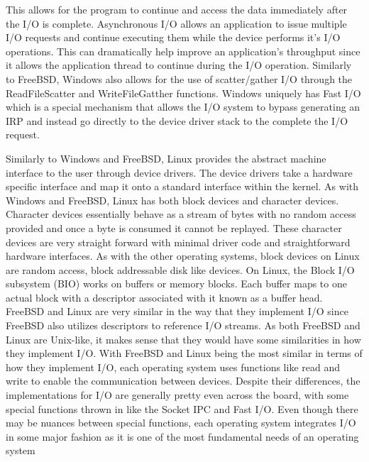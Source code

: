 \documentclass[letterpaper,10pt,draftclsnofoot,onecolumn,titlepage]{IEEEtran}
\begin{document}
	This allows for the program to continue and access the data immediately after the I/O is complete.
	Asynchronous I/O allows an application to issue multiple I/O requests and continue executing them while the device performs it's I/O operations.
	This can dramatically help improve an application's throughput since it allows the application thread to continue during the I/O operation.
	Similarly to FreeBSD, Windows also allows for the use of scatter/gather I/O through the ReadFileScatter and WriteFileGatther functions.
	Windows uniquely has Fast I/O which is a special mechanism that allows the I/O system to bypass generating an IRP and instead go directly to the device driver stack to the complete the I/O request.

	Similarly to Windows and FreeBSD, Linux provides the abstract machine interface to the user through device drivers.
	The device drivers take a hardware specific interface and map it onto a standard interface within the kernel.
	As with Windows and FreeBSD, Linux has both block devices and character devices.
	Character devices essentially behave as a stream of bytes with no random access provided and once a byte is consumed it cannot be replayed. \cite{Linux}
	These character devices are very straight forward with minimal driver code and straightforward hardware interfaces.
	As with the other operating systems, block devices on Linux are random access, block addressable disk like devices.
	On Linux, the Block I/O subsystem (BIO) works on buffers or memory blocks.
	Each buffer maps to one actual block with a descriptor associated with it known as a buffer head.
	FreeBSD and Linux are very similar in the way that they implement I/O since FreeBSD also utilizes descriptors to reference I/O streams.
	As both FreeBSD and Linux are Unix-like, it makes sense that they would have some similarities in how they implement I/O.
	With FreeBSD and Linux being the most similar in terms of how they implement I/O, each operating system uses functions like read and write to enable the communication between devices.
	Despite their differences, the implementations for I/O are generally pretty even across the board, with some special functions thrown in like the Socket IPC and Fast I/O.
	Even though there may be nuances between special functions, each operating system integrates I/O in some major fashion as it is one of the most fundamental needs of an operating system


\end{document}
